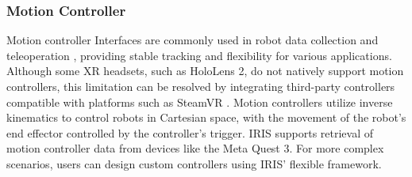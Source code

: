 

\subsubsection{Motion Controller}


Motion controller Interfaces are commonly used in robot data collection and teleoperation \cite{pettinger2020reducing, lin2022comparison}, providing stable tracking and flexibility for various applications. 
Although some XR headsets, such as HoloLens 2, do not natively support motion controllers, this limitation can be resolved by integrating third-party controllers compatible with platforms such as SteamVR \cite{steampoweredSteamVR}.
Motion controllers utilize inverse kinematics to control robots in Cartesian space, with the movement of the robot’s end effector controlled by the controller's trigger. 
IRIS supports retrieval of motion controller data from devices like the Meta Quest 3. 
For more complex scenarios, users can design custom controllers using IRIS' flexible framework.



